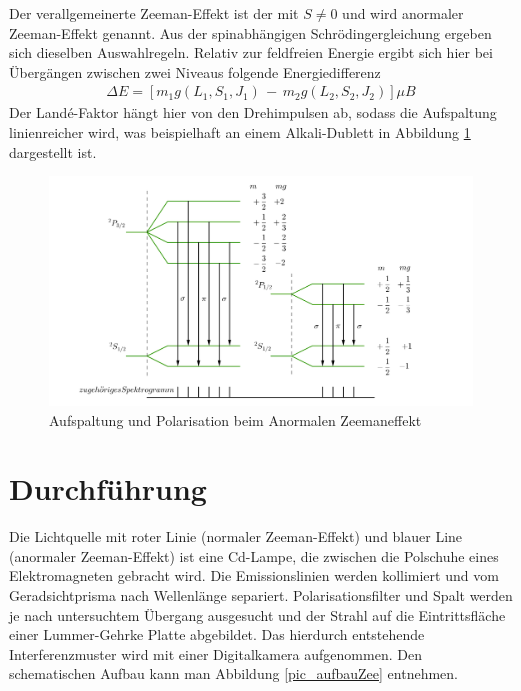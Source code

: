 Der verallgemeinerte Zeeman-Effekt ist der mit $S\neq0$ und wird anormaler Zeeman-Effekt genannt. Aus der spinabhängigen Schrödingergleichung ergeben
sich dieselben Auswahlregeln. Relativ zur feldfreien Energie ergibt sich hier bei Übergängen zwischen zwei Niveaus folgende Energiedifferenz
\begin{align}
 \Delta E = [m_1 g(L_1,S_1,J_1)\, - \,m_2g(L_2,S_2,J_2)]\mu B
 \label{eq_DeltaE}
\end{align}
Der Landé-Faktor hängt hier von den Drehimpulsen ab, sodass die Aufspaltung linienreicher wird, was beispielhaft an einem Alkali-Dublett in Abbildung
\ref{pic_anorZee} dargestellt ist.
\begin{figure}[H]
\includegraphics[width=1\textwidth]{../pics/anorZee.png}
\caption{Aufspaltung und Polarisation beim Anormalen Zeemaneffekt}
\label{pic_anorZee}
\end{figure}

\section{Durchführung}
Die Lichtquelle mit roter Linie (normaler Zeeman-Effekt) und blauer Line (anormaler Zeeman-Effekt) ist eine Cd-Lampe, die zwischen die Polschuhe eines
Elektromagneten gebracht wird. Die Emissionslinien werden kollimiert und vom Geradsichtprisma nach Wellenlänge separiert. Polarisationsfilter und
Spalt werden je nach untersuchtem Übergang ausgesucht und der Strahl auf die Eintrittsfläche einer Lummer-Gehrke Platte abgebildet. Das hierdurch
entstehende Interferenzmuster wird mit einer Digitalkamera aufgenommen. Den schematischen Aufbau kann man Abbildung \ref{pic_aufbauZee} entnehmen.

